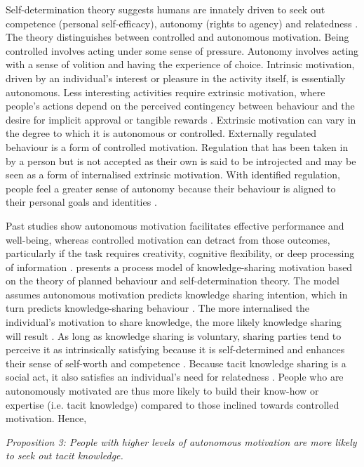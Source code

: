 Self-determination theory suggests humans are innately driven to seek out competence (personal self-efficacy), autonomy (rights to agency) and relatedness \citep{ryan2000self}. The theory distinguishes between controlled and autonomous motivation. Being controlled involves acting under some sense of pressure. Autonomy involves acting with a sense of volition and having the experience of choice. Intrinsic motivation, driven by an individual’s interest or pleasure in the activity itself, is essentially autonomous. Less interesting activities require extrinsic motivation, where people's actions depend on the perceived contingency between behaviour and the desire for implicit approval or tangible rewards \citep{gagne2005self}. Extrinsic motivation can vary in the degree to which it is autonomous or controlled. Externally regulated behaviour is a form of controlled motivation. Regulation that has been taken in by a person but is not accepted as their own is said to be introjected and may be seen as a form of internalised extrinsic motivation. With identified regulation, people feel a greater sense of autonomy because their behaviour is aligned to their personal goals and identities \citep{gagne2005self}. \medskip

Past studies show autonomous motivation facilitates effective performance and well-being, whereas controlled motivation can detract from those outcomes, particularly if the task requires creativity, cognitive flexibility, or deep processing of information \citep{gagne2005self}. \citet{gagne2009model} presents a process model of knowledge-sharing motivation based on the theory of planned behaviour and self-determination theory. The model assumes autonomous motivation predicts knowledge sharing intention, which in turn predicts knowledge-sharing behaviour \citep{gagne2009model}. The more internalised the individual’s motivation to share knowledge, the more likely knowledge sharing will result \citep{witherspoon2013antecedents}. As long as knowledge sharing is voluntary, sharing parties tend to perceive it as intrinsically satisfying because it is self-determined and enhances their sense of self-worth and competence \citep{kaser2001knowledge,lam2010knowledge,dumbach2014establishing}. Because tacit knowledge sharing is a social act, it also satisfies an individual's need for relatedness \citep{llopis2016understanding}. People who are autonomously motivated are thus more likely to build their know-how or expertise (i.e. tacit knowledge) compared to those inclined towards controlled motivation. Hence, \medskip
\begin{tcolorbox}
\emph{Proposition 3: People with higher levels of autonomous motivation are more likely to seek out tacit knowledge.}
\end{tcolorbox}


